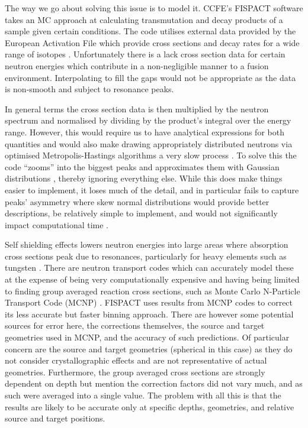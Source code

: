 \documentclass[12pt, a4paper]{article}
\begin{document}
		The way we go about solving this issue is to model it. CCFE's FISPACT \cite{fispact} software takes an MC approach at calculating transmutation and decay products of a sample given certain conditions. The code utilises external data provided by the European Activation File which provide cross sections and decay rates for a wide range of isotopes \cite{library}. Unfortunately there is a lack cross section data for certain neutron energies which contribute in a non-negligible manner to a fusion environment. Interpolating to fill the gaps would not be appropriate as the data is non-smooth and subject to resonance peaks.
		
		In general terms the cross section data is then multiplied by the neutron spectrum and normalised by dividing by the product's integral over the energy range. However, this would require us to have analytical expressions for both quantities and would also make drawing appropriately distributed neutrons via optimised Metropolis-Hastings algorithms a very slow process \cite{methast}. To solve this the code ``zooms'' into the biggest peaks and approximates them with Gaussian distributions \cite{transmute2}, thereby ignoring everything else. While this does make things easier to implement, it loses much of the detail, and in particular fails to capture peaks' asymmetry where skew normal distributions would provide better descriptions, be relatively simple to implement, and would not significantly impact computational time \cite{skewnorm1, skewnorm2}.
		
		Self shielding effects lowers neutron energies into large areas where absorption cross sections peak due to resonances, particularly for heavy elements such as tungsten \cite{transmute2}. There are neutron transport codes which can accurately model these at the expense of being very computationally expensive and having being limited to finding group averaged reaction cross sections, such as Monte Carlo N-Particle Transport Code (MCNP) \cite{mcnp}. FISPACT uses results from MCNP codes to correct its less accurate but faster binning approach. There are however some potential sources for error here, the corrections themselves, the source and target geometries used in MCNP, and the accuracy of such predictions. Of particular concern are the source and target geometries (spherical in this case) as they do not consider crystallographic effects and are not representative of actual geometries. Furthermore, the group averaged cross sections are strongly dependent on depth but \citet{transmute2} mention the correction factors did not vary much, and as such were averaged into a single value. The problem with all this is that the results are likely to be accurate only at specific depths, geometries, and relative source and target positions.
		
\end{document}
